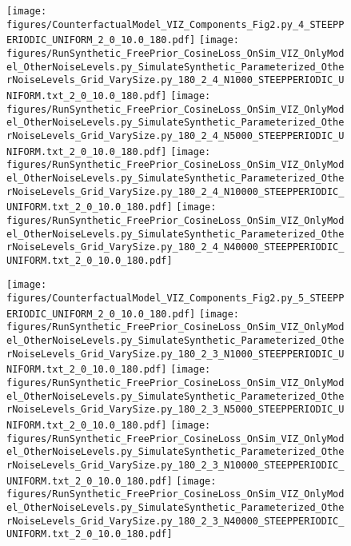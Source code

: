 \documentclass{article}
\begin{document}
\begin{figure}
\texttt{[image: figures/CounterfactualModel\_VIZ\_Components\_Fig2.py\_4\_STEEPPERIODIC\_UNIFORM\_2\_0\_10.0\_180.pdf]}
\texttt{[image: figures/RunSynthetic\_FreePrior\_CosineLoss\_OnSim\_VIZ\_OnlyModel\_OtherNoiseLevels.py\_SimulateSynthetic\_Parameterized\_OtherNoiseLevels\_Grid\_VarySize.py\_180\_2\_4\_N1000\_STEEPPERIODIC\_UNIFORM.txt\_2\_0\_10.0\_180.pdf]}
\texttt{[image: figures/RunSynthetic\_FreePrior\_CosineLoss\_OnSim\_VIZ\_OnlyModel\_OtherNoiseLevels.py\_SimulateSynthetic\_Parameterized\_OtherNoiseLevels\_Grid\_VarySize.py\_180\_2\_4\_N5000\_STEEPPERIODIC\_UNIFORM.txt\_2\_0\_10.0\_180.pdf]}
\texttt{[image: figures/RunSynthetic\_FreePrior\_CosineLoss\_OnSim\_VIZ\_OnlyModel\_OtherNoiseLevels.py\_SimulateSynthetic\_Parameterized\_OtherNoiseLevels\_Grid\_VarySize.py\_180\_2\_4\_N10000\_STEEPPERIODIC\_UNIFORM.txt\_2\_0\_10.0\_180.pdf]}
\texttt{[image: figures/RunSynthetic\_FreePrior\_CosineLoss\_OnSim\_VIZ\_OnlyModel\_OtherNoiseLevels.py\_SimulateSynthetic\_Parameterized\_OtherNoiseLevels\_Grid\_VarySize.py\_180\_2\_4\_N40000\_STEEPPERIODIC\_UNIFORM.txt\_2\_0\_10.0\_180.pdf]}


\texttt{[image: figures/CounterfactualModel\_VIZ\_Components\_Fig2.py\_5\_STEEPPERIODIC\_UNIFORM\_2\_0\_10.0\_180.pdf]}
\texttt{[image: figures/RunSynthetic\_FreePrior\_CosineLoss\_OnSim\_VIZ\_OnlyModel\_OtherNoiseLevels.py\_SimulateSynthetic\_Parameterized\_OtherNoiseLevels\_Grid\_VarySize.py\_180\_2\_3\_N1000\_STEEPPERIODIC\_UNIFORM.txt\_2\_0\_10.0\_180.pdf]}
\texttt{[image: figures/RunSynthetic\_FreePrior\_CosineLoss\_OnSim\_VIZ\_OnlyModel\_OtherNoiseLevels.py\_SimulateSynthetic\_Parameterized\_OtherNoiseLevels\_Grid\_VarySize.py\_180\_2\_3\_N5000\_STEEPPERIODIC\_UNIFORM.txt\_2\_0\_10.0\_180.pdf]}
\texttt{[image: figures/RunSynthetic\_FreePrior\_CosineLoss\_OnSim\_VIZ\_OnlyModel\_OtherNoiseLevels.py\_SimulateSynthetic\_Parameterized\_OtherNoiseLevels\_Grid\_VarySize.py\_180\_2\_3\_N10000\_STEEPPERIODIC\_UNIFORM.txt\_2\_0\_10.0\_180.pdf]}
\texttt{[image: figures/RunSynthetic\_FreePrior\_CosineLoss\_OnSim\_VIZ\_OnlyModel\_OtherNoiseLevels.py\_SimulateSynthetic\_Parameterized\_OtherNoiseLevels\_Grid\_VarySize.py\_180\_2\_3\_N40000\_STEEPPERIODIC\_UNIFORM.txt\_2\_0\_10.0\_180.pdf]}



\end{figure}
\end{document}
